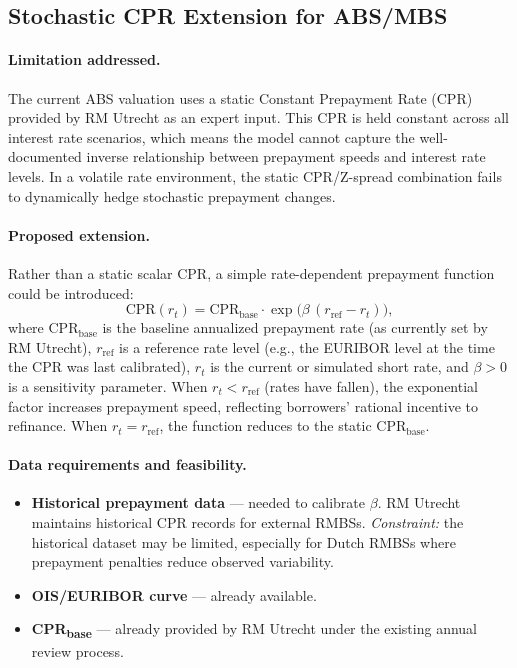 \documentclass[reviewdoc]{pmv_report}  %
\begin{document}
\subsection{Stochastic CPR Extension for ABS/MBS}\label{sec:StochasticCPR}

\paragraph{Limitation addressed.}
The current ABS valuation uses a static Constant Prepayment Rate (CPR) provided by RM Utrecht as an expert input.
This CPR is held constant across all interest rate scenarios, which means the model cannot capture the well-documented inverse relationship between prepayment speeds and interest rate levels.
In a volatile rate environment, the static CPR/Z-spread combination fails to dynamically hedge stochastic prepayment changes.

\paragraph{Proposed extension.}
Rather than a static scalar CPR, a simple rate-dependent prepayment function could be introduced:
\begin{equation}\label{eq:CPR}
  \text{CPR}(r_t) = \text{CPR}_{\text{base}} \cdot \exp\!\big(\beta\,(r_{\text{ref}} - r_t)\big),
\end{equation}
where $\text{CPR}_{\text{base}}$ is the baseline annualized prepayment rate (as currently set by RM Utrecht), $r_{\text{ref}}$ is a reference rate level (e.g., the EURIBOR level at the time the CPR was last calibrated), $r_t$ is the current or simulated short rate, and $\beta > 0$ is a sensitivity parameter.
When $r_t < r_{\text{ref}}$ (rates have fallen), the exponential factor increases prepayment speed, reflecting borrowers' rational incentive to refinance.
When $r_t = r_{\text{ref}}$, the function reduces to the static $\text{CPR}_{\text{base}}$.

\paragraph{Data requirements and feasibility.}
\begin{itemize}
  \item \textbf{Historical prepayment data} --- needed to calibrate $\beta$.
    RM Utrecht maintains historical CPR records for external RMBSs.
    \emph{Constraint:} the historical dataset may be limited, especially for Dutch RMBSs where prepayment penalties reduce observed variability.
  \item \textbf{OIS/EURIBOR curve} --- already available.
  \item \textbf{CPR\textsubscript{base}} --- already provided by RM Utrecht under the existing annual review process.
\end{itemize}
\end{document}
